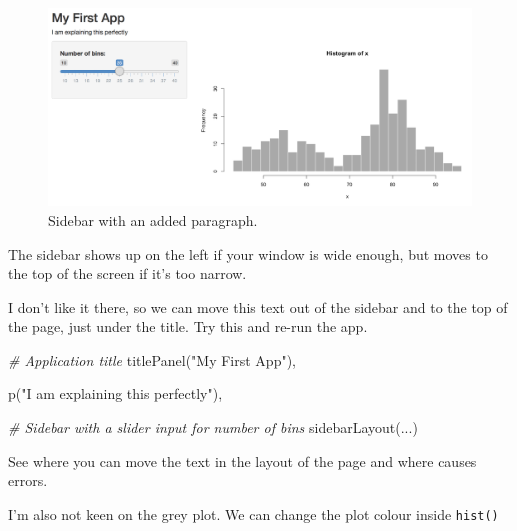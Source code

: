 \documentclass[
  oneside]{book}
\newenvironment{Shaded}{\begin{snugshade}}{\end{snugshade}}
\newcommand{\CommentTok}[1]{\textcolor[rgb]{0.56,0.35,0.01}{\textit{#1}}}
\newcommand{\FunctionTok}[1]{\textcolor[rgb]{0.00,0.00,0.00}{#1}}
\newcommand{\NormalTok}[1]{#1}
\newcommand{\StringTok}[1]{\textcolor[rgb]{0.31,0.60,0.02}{#1}}
\begin{document}
\begin{figure}

{\centering \includegraphics[width=1\linewidth]{images/demo_app/07-app-sidebar-p} 

}

\caption{Sidebar with an added paragraph.}\label{fig:first-app-sidebar-p}
\end{figure}

\begin{info}
The sidebar shows up on the left if your window is wide enough, but moves to the top of the screen if it's too narrow.

\end{info}

I don't like it there, so we can move this text out of the sidebar and to the top of the page, just under the title. Try this and re-run the app.

\begin{Shaded}
\begin{Highlighting}[]
   \CommentTok{\# Application title}
   \FunctionTok{titlePanel}\NormalTok{(}\StringTok{"My First App"}\NormalTok{),}

   \FunctionTok{p}\NormalTok{(}\StringTok{"I am explaining this perfectly"}\NormalTok{),}

   \CommentTok{\# Sidebar with a slider input for number of bins}
   \FunctionTok{sidebarLayout}\NormalTok{(...)}
\end{Highlighting}
\end{Shaded}

\begin{try}
See where you can move the text in the layout of the page and where causes errors.

\end{try}

I'm also not keen on the grey plot. We can change the plot colour inside \texttt{hist()}
\end{document}
